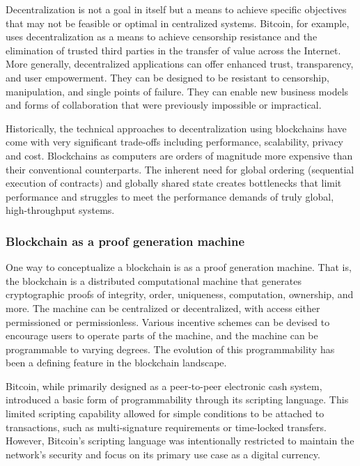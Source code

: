 \documentclass{article}
\begin{document}
Decentralization is not a goal in itself but a means to achieve specific objectives that may not be feasible or optimal in centralized systems. Bitcoin, for example, uses decentralization as a means to achieve censorship resistance and the elimination of trusted third parties in the transfer of value across the Internet. More generally, decentralized applications can offer enhanced trust, transparency, and user empowerment. They can be designed to be resistant to censorship, manipulation, and single points of failure. They can enable new business models and forms of collaboration that were previously impossible or impractical.

Historically, the technical approaches to decentralization using blockchains have come with very significant trade-offs including performance, scalability, privacy and cost. Blockchains as computers are orders of magnitude more expensive than their conventional counterparts. The inherent need for global ordering (sequential execution of contracts) and globally shared state creates bottlenecks that limit performance and struggles to meet the performance demands of truly global, high-throughput systems.

\subsubsection*{Blockchain as a proof generation machine}

One way to conceptualize a blockchain is as a proof generation machine. That is, the blockchain is a distributed computational machine that generates cryptographic proofs of integrity, order, uniqueness, computation, ownership, and more. The machine can be centralized or decentralized, with access either permissioned or permissionless. Various incentive schemes can be devised to encourage users to operate parts of the machine, and the machine can be programmable to varying degrees. The evolution of this programmability has been a defining feature in the blockchain landscape.

Bitcoin, while primarily designed as a peer-to-peer electronic cash system, introduced a basic form of programmability through its scripting language. This limited scripting capability allowed for simple conditions to be attached to transactions, such as multi-signature requirements or time-locked transfers. However, Bitcoin's scripting language was intentionally restricted to maintain the network's security and focus on its primary use case as a digital currency.
\end{document}
